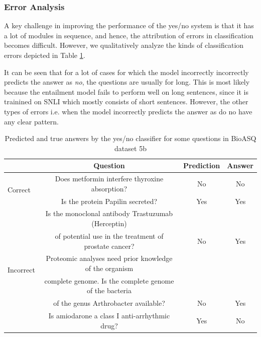 \subsubsection{Error Analysis}

A key challenge in improving the performance of the yes/no system is that it has a lot of modules in sequence, and hence, the attribution of errors in classification becomes difficult. However, we qualitatively analyze the kinds of classification errors depicted in Table \ref{tab:yesno_error_analysis}. 

It can be seen that for a lot of cases for which the model incorrectly incorrectly predicts the answer as \textit{no}, the questions are usually for long. This is most likely because the entailment model fails to perform well on long sentences, since it is trainined on SNLI which mostly consists of short sentences. However, the other types of errors i.e. when the model incorrectly predicts the answer as  do no have any clear pattern. 

\begin{table}[h]
    \centering
    \begin{tabular}{|l|c|c|c|} \hline
& Question & Prediction & Answer \\ \hline
\multirow{2}{*}{Correct} & Does metformin interfere thyroxine absorption? & No & No \\  \cline{2-4}
& Is the protein Papilin secreted?  & Yes & Yes \\ \hline
\multirow{6}{*}{Incorrect}
& Is the monoclonal antibody Trastuzumab (Herceptin) & & \\ & of potential use in the treatment of prostate cancer? & No & Yes \\ \cline{2-4}
& Proteomic analyses need prior knowledge of the organism & & \\ 
& complete genome. Is the complete genome of the bacteria & & \\
& of the genus Arthrobacter available? & No & Yes \\ \cline{2-4}
& Is amiodarone a class I anti-arrhythmic drug? & Yes & No \\ \hline
    \end{tabular}
    \caption{Predicted and true answers by the yes/no classifier for some questions in BioASQ dataset 5b}
    \label{tab:yesno_error_analysis}
\end{table}